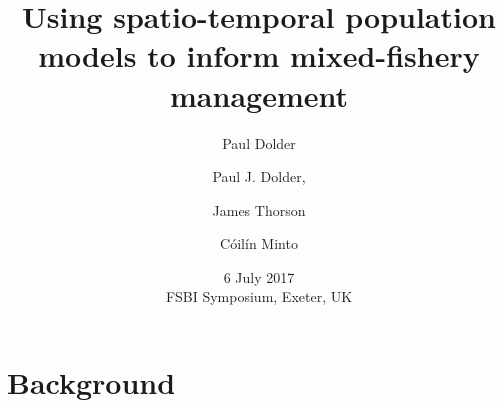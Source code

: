 \documentclass[xcolor=x11names,compress]{beamer}
\renewcommand{\(}{\begin{columns}}
\renewcommand{\)}{\end{columns}}
\newcommand{\<}[1]{\begin{column}{#1}}
\renewcommand{\>}{\end{column}}
\begin{document}
\addtocounter{framenumber}{-1}

\begin{frame}
\title{Using spatio-temporal population models to inform mixed-fishery management}

\author{Paul Dolder}
\author[shortname]{Paul J. Dolder,  \and 
	James Thorson  \and 
	Cóilín Minto}
\vspace{-0.5cm}


\date{6 July 2017 \\ FSBI Symposium, Exeter, UK}
\titlepage
\end{frame}



\section{Background}
\end{document}
